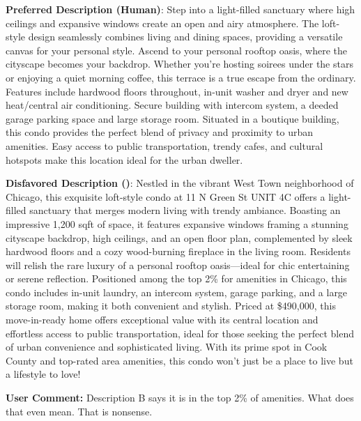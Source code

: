 \begin{center}\begin{tcolorbox}[colback=white,colframe=gray!20,width=0.95\textwidth]
   {\footnotesize \textbf{Preferred Description (Human)}:  Step into a light-filled sanctuary where high ceilings and expansive windows create an open and airy atmosphere. The loft-style design seamlessly combines living and dining spaces, providing a versatile canvas for your personal style. Ascend to your personal rooftop oasis, where the cityscape becomes your backdrop. Whether you're hosting soirees under the stars or enjoying a quiet morning coffee, this terrace is a true escape from the ordinary.  Features include hardwood floors throughout, in-unit washer and dryer and new heat/central air conditioning. Secure building with intercom system, a deeded garage parking space and large storage room.  Situated in a boutique building, this condo provides the perfect blend of privacy and proximity to urban amenities. Easy access to public transportation, trendy cafes, and cultural hotspots make this location ideal for the urban dweller. }
    \vspace{0.2em}

    {\footnotesize \textbf{Disfavored Description (\agentname)}:  Nestled in the vibrant West Town neighborhood of Chicago, this exquisite loft-style condo at 11 N Green St UNIT 4C offers a light-filled sanctuary that merges modern living with trendy ambiance. Boasting an impressive 1,200 sqft of space, it features expansive windows framing a stunning cityscape backdrop, high ceilings, and an open floor plan, complemented by sleek hardwood floors and a cozy wood-burning fireplace in the living room. Residents will relish the rare luxury of a personal rooftop oasis—ideal for chic entertaining or serene reflection. Positioned among the top 2\% for amenities in Chicago, this condo includes in-unit laundry, an intercom system, garage parking, and a large storage room, making it both convenient and stylish. Priced at \$490,000, this move-in-ready home offers exceptional value with its central location and effortless access to public transportation, ideal for those seeking the perfect blend of urban convenience and sophisticated living. With its prime spot in Cook County and top-rated area amenities, this condo won't just be a place to live but a lifestyle to love! }
    \vspace{0.2em}

    {\footnotesize \textbf{User Comment:} Description B says it is in the top 2\% of amenities. What does that even mean. That is nonsense.  }
    \end{tcolorbox}\end{center}


